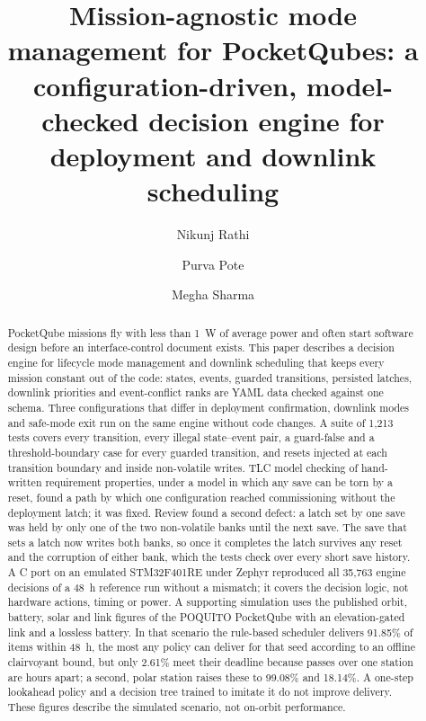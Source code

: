 \documentclass[preprint,12pt]{elsarticle}
\newcommand{\TestCount}{1,213}
\begin{document}
\begin{frontmatter}

\title{Mission-agnostic mode management for PocketQubes: a configuration-driven, model-checked decision engine for deployment and downlink scheduling}

\author{Nikunj Rathi}
\author{Purva Pote}
\author{Megha Sharma}

\begin{abstract}
PocketQube missions fly with less than 1~W of average power and often start software design before an interface-control document exists. This paper describes a decision engine for lifecycle mode management and downlink scheduling that keeps every mission constant out of the code: states, events, guarded transitions, persisted latches, downlink priorities and event-conflict ranks are YAML data checked against one schema. Three configurations that differ in deployment confirmation, downlink modes and safe-mode exit run on the same engine without code changes. A suite of \TestCount{} tests covers every transition, every illegal state--event pair, a guard-false and a threshold-boundary case for every guarded transition, and resets injected at each transition boundary and inside non-volatile writes. TLC model checking of hand-written requirement properties, under a model in which any save can be torn by a reset, found a path by which one configuration reached commissioning without the deployment latch; it was fixed. Review found a second defect: a latch set by one save was held by only one of the two non-volatile banks until the next save. The save that sets a latch now writes both banks, so once it completes the latch survives any reset and the corruption of either bank, which the tests check over every short save history. A C port on an emulated STM32F401RE under Zephyr reproduced all 35,763 engine decisions of a 48~h reference run without a mismatch; it covers the decision logic, not hardware actions, timing or power. A supporting simulation uses the published orbit, battery, solar and link figures of the POQUITO PocketQube with an elevation-gated link and a lossless battery. In that scenario the rule-based scheduler delivers 91.85\% of items within 48~h, the most any policy can deliver for that seed according to an offline clairvoyant bound, but only 2.61\% meet their deadline because passes over one station are hours apart; a second, polar station raises these to 99.08\% and 18.14\%. A one-step lookahead policy and a decision tree trained to imitate it do not improve delivery. These figures describe the simulated scenario, not on-orbit performance.
\end{abstract}


\end{frontmatter}
\end{document}

